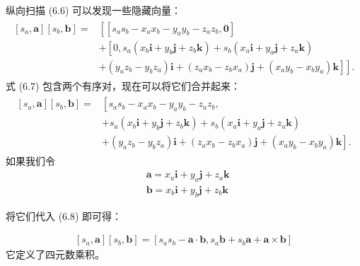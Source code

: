 纵向扫描 (6.6) 可以发现一些隐藏向量：
\begin{align}
    \begin{aligned}
        {\left[s_{a}, \mathbf{a}\right]\left[s_{b}, \mathbf{b}\right]=} & {\left[\left[s_{a} s_{b}-x_{a} x_{b}-y_{a} y_{b}-z_{a} z_{b}, \mathbf{0}\right]\right.}                                                                                      \\
                                                                        & +\left[0, s_{a}\left(x_{b} \mathbf{i}+y_{b} \mathbf{j}+z_{b} \mathbf{k}\right)+s_{b}\left(x_{a} \mathbf{i}+y_{a} \mathbf{j}+z_{a} \mathbf{k}\right)\right.                   \\
                                                                        & \left.\left.+\left(y_{a} z_{b}-y_{b} z_{a}\right) \mathbf{i}+\left(z_{a} x_{b}-z_{b} x_{a}\right) \mathbf{j}+\left(x_{a} y_{b}-x_{b} y_{a}\right) \mathbf{k}\right]\right] .
    \end{aligned}
\end{align}
式 (6.7) 包含两个有序对，现在可以将它们合并起来：
\begin{align}
    \begin{aligned}
        {\left[s_{a}, \mathbf{a}\right]\left[s_{b}, \mathbf{b}\right]=} & {\left[s_{a} s_{b}-x_{a} x_{b}-y_{a} y_{b}-z_{a} z_{b},\right.}                                                                                                 \\
                                                                        & +s_{a}\left(x_{b} \mathbf{i}+y_{b} \mathbf{j}+z_{b} \mathbf{k}\right)+s_{b}\left(x_{a} \mathbf{i}+y_{a} \mathbf{j}+z_{a} \mathbf{k}\right)                      \\
                                                                        & \left.+\left(y_{a} z_{b}-y_{b} z_{a}\right) \mathbf{i}+\left(z_{a} x_{b}-z_{b} x_{a}\right) \mathbf{j}+\left(x_{a} y_{b}-x_{b} y_{a}\right) \mathbf{k}\right] .
    \end{aligned}
\end{align}
如果我们令
$$
    \begin{aligned}
         & \mathbf{a}=x_{a} \mathbf{i}+y_{a} \mathbf{j}+z_{a} \mathbf{k} \\
         & \mathbf{b}=x_{b} \mathbf{i}+y_{b} \mathbf{j}+z_{b} \mathbf{k}
    \end{aligned}
$$

将它们代入 (6.8) 即可得：

\begin{align}
    \left[s_{a}, \mathbf{a}\right]\left[s_{b}, \mathbf{b}\right]=\left[s_{a} s_{b}-\mathbf{a} \cdot \mathbf{b}, s_{a} \mathbf{b}+s_{b} \mathbf{a}+\mathbf{a} \times \mathbf{b}\right]
\end{align}
它定义了四元数乘积。


